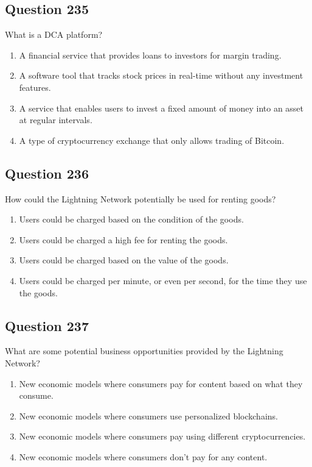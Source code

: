 \documentclass[12pt,a4paper]{article}
\begin{document}
\bigskip


\subsection*{Question 235}
What is a DCA platform?

\begin{enumerate}[label=\Alph*., leftmargin=*]
\item A financial service that provides loans to investors for margin trading.
\item A software tool that tracks stock prices in real-time without any investment features.
\item A service that enables users to invest a fixed amount of money into an asset at regular intervals.
\item A type of cryptocurrency exchange that only allows trading of Bitcoin.
\end{enumerate}

\bigskip


\subsection*{Question 236}
How could the Lightning Network potentially be used for renting goods?

\begin{enumerate}[label=\Alph*., leftmargin=*]
\item Users could be charged based on the condition of the goods.
\item Users could be charged a high fee for renting the goods.
\item Users could be charged based on the value of the goods.
\item Users could be charged per minute, or even per second, for the time they use the goods.
\end{enumerate}

\bigskip


\subsection*{Question 237}
What are some potential business opportunities provided by the Lightning Network?

\begin{enumerate}[label=\Alph*., leftmargin=*]
\item New economic models where consumers pay for content based on what they consume.
\item New economic models where consumers use personalized blockchains.
\item New economic models where consumers pay using different cryptocurrencies.
\item New economic models where consumers don't pay for any content.
\end{enumerate}
\end{document}
